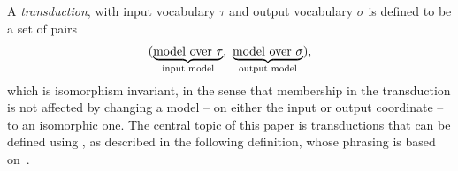  A \emph{transduction}, with input vocabulary $\tau$ and output vocabulary $\sigma$ is defined to be a set of pairs 
\begin{align*}
    (\myunderbrace{\text{model over $\tau$}}{input model}, \ 
    \myunderbrace{\text{model over $\sigma$}}{output model}),
\end{align*}
which is isomorphism invariant, in the sense that membership in the transduction is not affected by changing a model -- on either the input or output coordinate -- to an isomorphic one. The central topic of this paper is transductions that can be defined using \mso, as described in the following definition, whose phrasing is based on~\cite[p.~9--10]{bojanczykOptimizingTreeDecompositions2017a}. 


